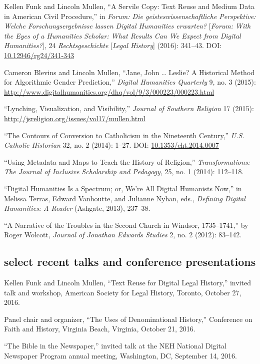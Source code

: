 \documentclass[11pt]{article}
\begin{document}
Kellen Funk and Lincoln Mullen, ``A Servile Copy: Text Reuse and Medium Data 
in American Civil Procedure,'' in \emph{Forum: Die geisteswissenschaftliche 
  Perspektive: Welche Forschungsergebnisse lassen Digital Humanities 
  erwarten?} [\emph{Forum: With the Eyes of a Humanities Scholar: What Results 
  Can We Expect from Digital Humanities?}], 24 \emph{Rechtsgeschichte} 
[\emph{Legal History}] (2016): 341--43. DOI: 
\href{http://dx.doi.org/10.12946/rg24/341-343}{10.12946/rg24/341-343}

Cameron Blevins and Lincoln Mullen, ``Jane, John \ldots{} Leslie? A
Historical Method for Algorithmic Gender Prediction,'' \emph{Digital
  Humanities Quarterly} 9, no. 3 (2015): 
\url{http://www.digitalhumanities.org/dhq/vol/9/3/000223/000223.html}

``Lynching, Visualization, and Visibility,'' \emph{Journal of Southern 
  Religion} 17 (2015): \url{http://jsreligion.org/issues/vol17/mullen.html}

``The Contours of Conversion to Catholicism in the Nineteenth Century,''
\emph{U.S. Catholic Historian} 32, no. 2 (2014): 1--27. DOI:
\href{http://dx.doi.org/10.1353/cht.2014.0007}{10.1353/cht.2014.0007}

``Using Metadata and Maps to Teach the History of Religion,''
\emph{Transformations: The Journal of Inclusive Scholarship and
  Pedagogy}, 25, no. 1 (2014): 112--118.

``Digital Humanities Is a Spectrum; or, We're All Digital Humanists
Now,'' in Melissa Terras, Edward Vanhoutte, and Julianne Nyhan, eds.,
\emph{Defining Digital Humanities: A Reader} (Ashgate, 2013), 237--38.

``A Narrative of the Troubles in the Second Church in Windsor,
1735--1741,'' by Roger Wolcott, \emph{Journal of Jonathan Edwards
  Studies} 2, no. 2 (2012): 83--142.

\subsection{select recent talks and conference presentations}

Kellen Funk and Lincoln Mullen, ``Text Reuse for Digital Legal History,'' 
invited talk and workshop, American Society for Legal History, Toronto, October 27, 2016.

Panel chair and organizer, ``The Uses of Denominational History,'' Conference 
on Faith and History, Virginia Beach, Virginia, October 21, 2016.

``The Bible in the Newspaper,'' invited talk at the NEH National Digital 
Newspaper Program annual meeting, Washington, DC, September 14, 2016.
\end{document}
